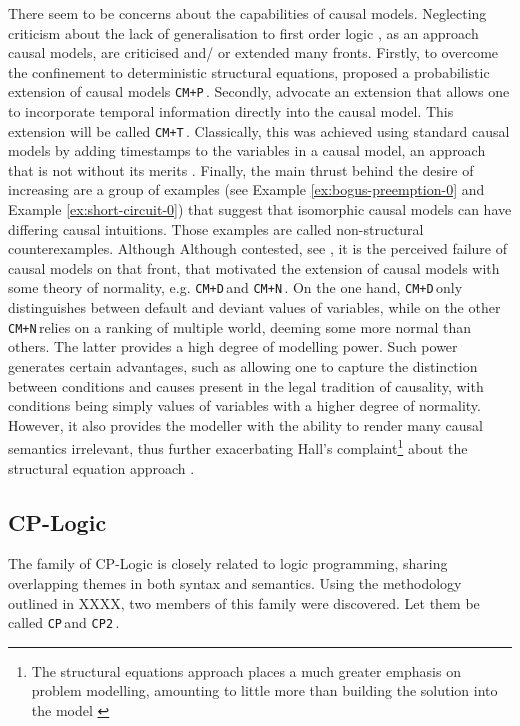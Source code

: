 \documentclass[11pt,a4paper]{book}
\theoremstyle{definition}
\theoremstyle{definition}
\theoremstyle{definition}
\theoremstyle{remark}
\newcommand{\cp}{\texttt{CP}\,}
\newcommand{\cpp}{\texttt{CP2}\,}
\newcommand{\cmn}{\texttt{CM+N}\,}
\newcommand{\cmp}{\texttt{CM+P}\,}
\newcommand{\cmd}{\texttt{CM+D}\,}
\newcommand{\cmt}{\texttt{CM+T}\,}
\begin{document}
There seem to be concerns about the capabilities of causal models. 
Neglecting criticism about the lack of generalisation to first order logic \parencite{batusov2018situation}, as an approach causal models, are criticised and/ or extended many fronts.
Firstly, to overcome the confinement to deterministic structural equations, \parencite{fenton2017proposed} proposed a probabilistic extension of causal models \cmp.
Secondly, \parencite{beckers2018principled} advocate an extension that allows one to incorporate temporal information directly into the causal model. This extension will be called \cmt. Classically, this was achieved using standard causal models by 
adding timestamps to the variables in a causal model, an approach that is not without its merits \parencite{ibeling2018conditional}. 
Finally, the main thrust behind the desire of increasing are a group of examples (see Example \ref{ex:bogus-preemption-0} and Example \ref{ex:short-circuit-0}) that suggest that 
isomorphic causal models can have differing causal intuitions. Those examples are called non-structural counterexamples. Although
Although contested, see \parencite{blanchard2017cause}, it is the perceived failure of causal models on that front, that motivated the extension of causal models with some theory of normality, e.g.  \cmd and \cmn. 
On the one hand, \cmd only distinguishes between default and deviant values of variables, while on the other \cmn relies on a ranking of multiple world, deeming some more normal than others.
The latter provides a high degree of modelling power. Such power generates certain advantages, such as allowing one to capture the distinction between conditions and causes present in the legal tradition of causality, with conditions being simply values of variables with a higher degree of normality. However, it also provides the modeller with the ability to render many causal semantics irrelevant, thus further exacerbating Hall's complaint\footnote{The structural equations approach places a much greater emphasis on problem modelling, amounting to little more than building the solution into the model \cite{erwig2010causal}} about the structural equation approach \parencite{blanchard2017cause,halpern2015graded,weslake2015partial}. 

\subsection{CP-Logic}
The family of CP-Logic is closely related to logic programming, sharing overlapping themes in both syntax and semantics.
Using the methodology outlined in XXXX, two members of this family were discovered. Let them be called \cp and \cpp \parencite{denecker2019explaining}.
\end{document}
